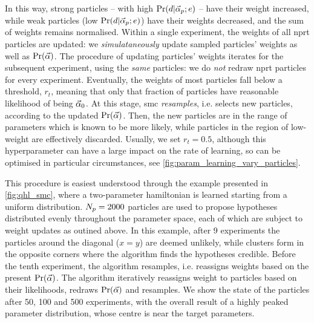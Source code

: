 In this way, strong \glspl{particle} -- with high $\Pr(d | \vec{\alpha}_p; e)$ -- have their weight increased, 
    while weak \glspl{particle} (low $\Pr(d | \vec{\alpha}_p; e)$) have their weights decreased, 
    and the sum of weights remains normalised. 
Within a single experiment, the weights of all \gls{nprt} \glspl{particle} are updated:
    we \emph{simulataneously} update sampled \glspl{particle}' weights as well as $\Pr(\vec{\alpha})$. 
The procedure of updating \glspl{particle}' weights iterates for the subsequent experiment, using the \emph{same} \glspl{particle}: 
    we do \emph{not} redraw \gls{nprt} \glspl{particle} for every experiment.
Eventually, the weights of most \glspl{particle} fall below a threshold, $r_t$, 
    meaning that only that fraction of \glspl{particle} have reasonable \gls{likelihood} of being $\vec{\alpha}_0$.
At this stage, \gls{smc} \emph{resamples}, i.e. selects new \glspl{particle}, according to the updated $\Pr(\vec{\alpha})$\footnotemark.
Then, the new \glspl{particle} are in the range of parameters which is known to be more likely, 
    while \glspl{particle} in the region of low-weight are effectively discarded. 
Usually, we set $r_t=0.5$, although this \gls{hyperparameter} can have a large impact 
    on the rate of learning, so can be optimised in particular circumstances, 
    see \cref{fig:param_learning_vary_particles}.
\par 
This procedure is easiest understood through the example presented in \cref{fig:qhl_smc}, 
    where a two-parameter \gls{hamiltonian} is learned starting from a uniform distribution. 
$N_p=2000$ \glspl{particle} are used to propose hypotheses distributed evenly throughout the parameter space, 
    each of which are subject to weight updates as outined above. 
In this example, after 9 \glspl{experiment} the \glspl{particle} around the diagonal ($x=y$) are deemed unlikely, 
    while clusters form in the opposite corners where the algorithm finds the hypotheses credible. 
Before the tenth experiment, the algorithm resamples, i.e. reassigns weights based on the present $\Pr(\vec{\alpha})$. 
The algorithm iteratively reassigns weight to \glspl{particle} based on their likelihoods, redraws $\Pr(\vec{\alpha})$ and resamples. 
We show the state of the \glspl{particle} after 50, 100 and 500 \glspl{experiment},
    with the overall result of a highly peaked parameter distribution, 
    whose centre is near the target parameters. 


